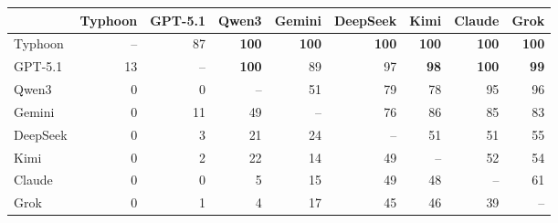 \begin{tabular}{lrrrrrrrr}
\toprule
 & Typhoon & GPT-5.1 & Qwen3 & Gemini & DeepSeek & Kimi & Claude & Grok \\
\midrule
Typhoon & -- & 87 & \textbf{100} & \textbf{100} & \textbf{100} & \textbf{100} & \textbf{100} & \textbf{100} \\
GPT-5.1 & 13 & -- & \textbf{100} & 89 & 97 & \textbf{98} & \textbf{100} & \textbf{99} \\
Qwen3 & 0 & 0 & -- & 51 & 79 & 78 & 95 & 96 \\
Gemini & 0 & 11 & 49 & -- & 76 & 86 & 85 & 83 \\
DeepSeek & 0 & 3 & 21 & 24 & -- & 51 & 51 & 55 \\
Kimi & 0 & 2 & 22 & 14 & 49 & -- & 52 & 54 \\
Claude & 0 & 0 & 5 & 15 & 49 & 48 & -- & 61 \\
Grok & 0 & 1 & 4 & 17 & 45 & 46 & 39 & -- \\
\bottomrule
\end{tabular}
